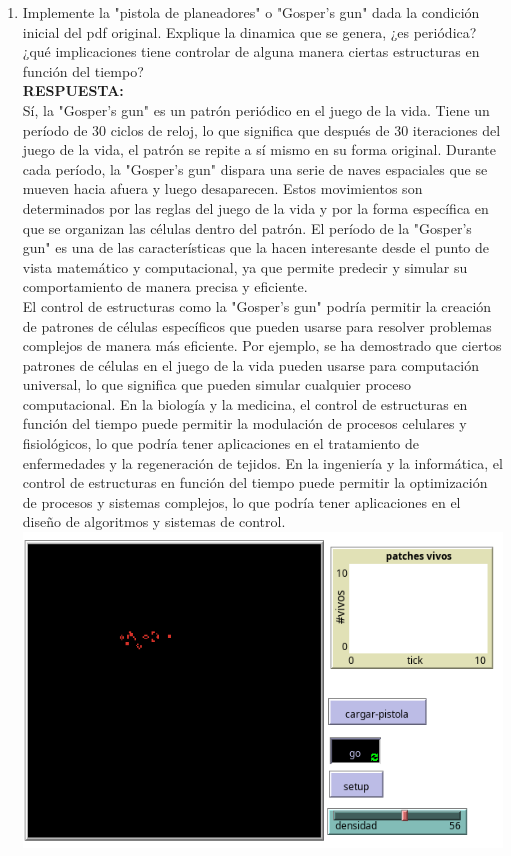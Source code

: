 \documentclass[12pt]{article}
\begin{document}
\begin{enumerate}
    \item Implemente la "pistola de planeadores" o "Gosper's gun" dada la condición inicial del pdf original.
    Explique la dinamica que se genera, ¿es periódica? ¿qué implicaciones tiene controlar de alguna manera ciertas estructuras en función del tiempo?\\
    \textbf{\color{red} RESPUESTA:}\\
    Sí, la "Gosper's gun" es un patrón periódico en el juego de la vida. Tiene un período de 30 ciclos de reloj, lo que significa que después de 30 iteraciones del juego de la vida, el patrón se repite a sí mismo en su forma original.
    Durante cada período, la "Gosper's gun" dispara una serie de naves espaciales que se mueven hacia afuera y luego desaparecen. Estos movimientos son determinados por las reglas del juego de la vida y por la forma específica en que se organizan las células dentro del patrón.
    El período de la "Gosper's gun" es una de las características que la hacen interesante desde el punto de vista matemático y computacional, ya que permite predecir y simular su comportamiento de manera precisa y eficiente.\\
    El control de estructuras como la "Gosper's gun" podría permitir la creación de patrones de células específicos que pueden usarse para resolver problemas complejos de manera más eficiente. Por ejemplo, se ha demostrado que ciertos patrones de células en el juego de la vida pueden usarse para computación universal, lo que significa que pueden simular cualquier proceso computacional.
    En la biología y la medicina, el control de estructuras en función del tiempo puede permitir la modulación de procesos celulares y fisiológicos, lo que podría tener aplicaciones en el tratamiento de enfermedades y la regeneración de tejidos.
    En la ingeniería y la informática, el control de estructuras en función del tiempo puede permitir la optimización de procesos y sistemas complejos, lo que podría tener aplicaciones en el diseño de algoritmos y sistemas de control.\\

    \includegraphics[scale = 0.40]{images/pistola.png}



\end{enumerate}
\end{document}
